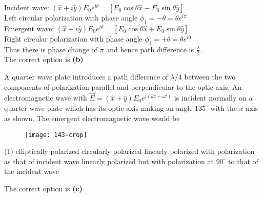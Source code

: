 \begin{enumerate}
\begin{tasks}
\end{tasks}
\begin{answer}
	Incident wave: $(\hat{x}+i \hat{y}) E_{0} e^{i \theta}=\left[E_{0} \cos \theta \hat{x}-E_{0} \sin \theta \hat{y}\right]$\\
	Left circular polarization with phase angle $\phi_{1}=-\theta=\theta e^{i \pi}$\\
	Emergent wave: $(\hat{x}-i \hat{y}) E_{0} e^{i \theta}=\left[E_{0} \cos \theta \hat{x}+E_{0} \sin \theta \hat{y}\right]$\\
	Right circular polarization with phase angle $\phi_{1}=+\theta=\theta e^{i 0}$\\
	Thus there is phase change of $\pi$ and hence path difference is $\frac{\lambda}{2}$.\\
	The correct option is \textbf{(b)}	
\end{answer}
\begin{minipage}{\textwidth}
	\item A quarter wave plate introduces a path difference of $\lambda / 4$ between the two components of polarization parallel and perpendicular to the optic axis. An electromagnetic wave with $\vec{E}=(\hat{x}+\hat{y}) E_{0} e^{i(k z-\omega t)}$ is incident normally on a quarter wave plate which has its optic axis making an angle $135^{\circ}$ with the $x$-axis as shown. The emergent electromagnetic wave would be
	\begin{figure}[H]
		\centering
		\texttt{[image: 143-crop]}
	\end{figure}
\end{minipage}
\begin{tasks}(1)
	\task[\textbf{A.}] elliptically polarized
	\task[\textbf{B.}]circularly polarized
	\task[\textbf{C.}]linearly polarized with polarization as that of incident wave
	\task[\textbf{D.}]linearly polarized but with polarization at $90^{\circ}$ to that of the incident wave
\end{tasks}
\begin{answer}
	The correct option is \textbf{(c)}	
\end{answer}


\end{enumerate}
